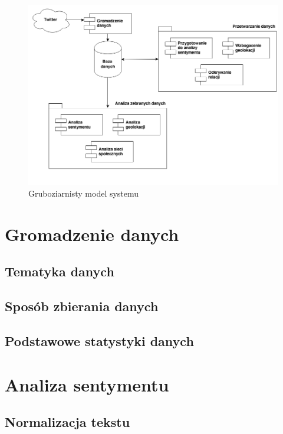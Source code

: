 \begin{figure}[ht!]
\centering
\includegraphics[width=160mm]{img/budowa-systemu.png}
\caption{Gruboziarnisty model systemu}
\label{image:gruboziarnisty-model-systemu}
\end{figure}

\section{Gromadzenie danych}
\label{section:gromadzeniedanych}
\subsection{Tematyka danych}
\subsection{Sposób zbierania danych}
\subsection{Podstawowe statystyki danych}


\clearpage
\section{Analiza sentymentu}
\label{section:analizasentymentu}

\subsection{Normalizacja tekstu}
